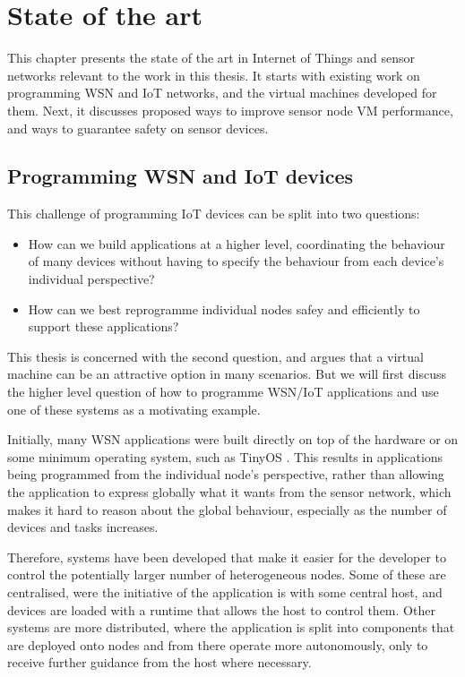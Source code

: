 \chapter{State of the art}
This chapter presents the state of the art in Internet of Things and sensor networks relevant to the work in this thesis. It starts with existing work on programming WSN and IoT networks, and the virtual machines developed for them. Next, it discusses proposed ways to improve sensor node VM performance, and ways to guarantee safety on sensor devices.

\section{Programming WSN and IoT devices}

This challenge of programming IoT devices can be split into two questions:

\begin{itemize}
	\item How can we build applications at a higher level, coordinating the behaviour of many devices without having to specify the behaviour from each device's individual perspective?
	\item How can we best reprogramme individual nodes safey and efficiently to support these applications?
\end{itemize}

This thesis is concerned with the second question, and argues that a virtual machine can be an attractive option in many scenarios. But we will first discuss the higher level question of how to programme WSN/IoT applications and use one of these systems as a motivating example.

Initially, many WSN applications were built directly on top of the hardware or on some minimum operating system, such as TinyOS \cite{Levis:2004ws}. This results in applications being programmed from the individual node's perspective, rather than allowing the application to express globally what it wants from the sensor network, which makes it hard to reason about the global behaviour, especially as the number of devices and tasks increases.

Therefore, systems have been developed that make it easier for the developer to control the potentially larger number of heterogeneous nodes. Some of these are centralised, were the initiative of the application is with some central host, and devices are loaded with a runtime that allows the host to control them. Other systems are more distributed, where the application is split into components that are deployed onto nodes and from there operate more autonomously, only to receive further guidance from the host where necessary.

